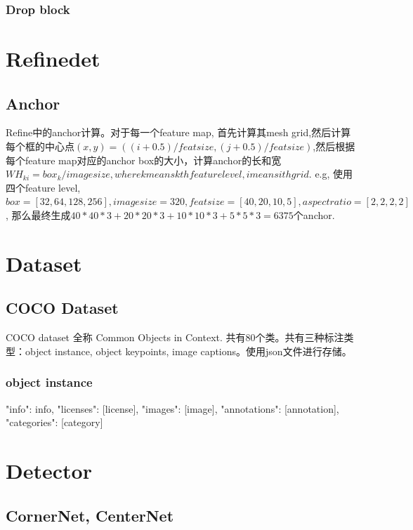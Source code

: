 \documentclass{article}
\begin{document}
\subsubsection{Drop block}

\section{Refinedet}
\subsection{Anchor}
Refine中的anchor计算。对于每一个feature map, 首先计算其mesh grid,然后计算每个框的中心点$(x,y)=((i+0.5)/featsize,(j+0.5)/featsize)$,然后根据每个feature map对应的anchor box的大小，计算anchor的长和宽$WH_{ki}=box_k/imagesize, where k means kth feature level, i means ith grid$. e.g, 使用四个feature level, $box=[32,64,128,256], imagesize=320, featsize=[40,20,10,5], aspect ratio=[2,2,2,2]$, 那么最终生成$40*40*3+20*20*3+10*10*3+5*5*3=6375$个anchor.


\section{Dataset}
\subsection{COCO Dataset}
COCO dataset 全称 Common Objects in Context. 共有80个类。共有三种标注类型：object instance, object keypoints, image captions。使用json文件进行存储。
\subsubsection{object instance}
{
    "info": info,
    "licenses": [license],
    "images": [image],
    "annotations": [annotation],
    "categories": [category]
}

\section{Detector}
\subsection{CornerNet, CenterNet}
\end{document}
